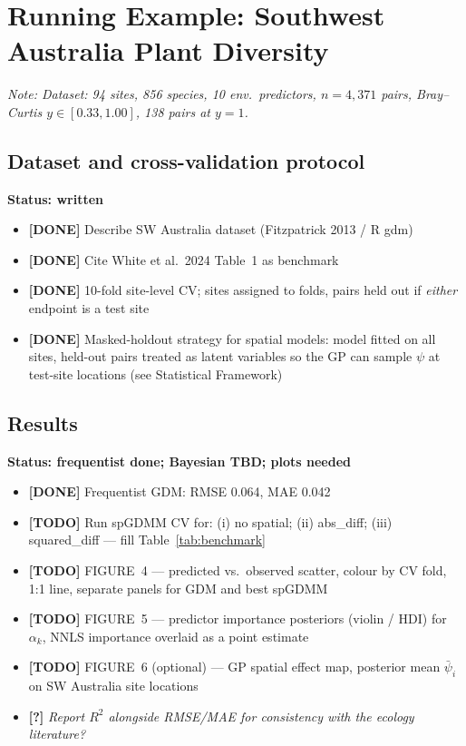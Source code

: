 \documentclass[11pt,a4paper]{article}
\newcommand{\done}[1]{{\color{donegreen}\textbf{[DONE]} #1}}
\newcommand{\todo}[1]{{\color{todored}\textbf{[TODO]} #1}}
\newcommand{\question}[1]{{\color{questionblue}\textbf{[?]} \textit{#1}}}
\newcommand{\note}[1]{{\color{notegray}\textit{Note: #1}}}
\newenvironment{scaffold}[1]{%
  \begin{mdframed}[backgroundcolor=gray!6, linecolor=gray!30,
                   leftmargin=0pt, rightmargin=0pt,
                   innerleftmargin=8pt, innerrightmargin=8pt,
                   innertopmargin=6pt, innerbottommargin=6pt]
  \noindent\textbf{#1}\par\vspace{2pt}
  \begin{itemize}[leftmargin=1.4em, topsep=2pt, itemsep=1pt, parsep=0pt]
}{%
  \end{itemize}
  \end{mdframed}
  \vspace{4pt}
}
\begin{document}
\section{Running Example: Southwest Australia Plant Diversity}

\note{Dataset: 94 sites, 856 species, 10 env.\ predictors,
$n = 4{,}371$ pairs, Bray--Curtis $y \in [0.33, 1.00]$, 138 pairs at $y=1$.}

\subsection{Dataset and cross-validation protocol}

\begin{scaffold}{Status: written}
  \item \done{Describe SW Australia dataset (Fitzpatrick 2013 / R gdm)}
  \item \done{Cite White et al.\ 2024 Table~1 as benchmark}
  \item \done{10-fold site-level CV; sites assigned to folds,
    pairs held out if \emph{either} endpoint is a test site}
  \item \done{Masked-holdout strategy for spatial models: model fitted on
    all sites, held-out pairs treated as latent variables so the GP can
    sample $\psi$ at test-site locations (see Statistical Framework)}
\end{scaffold}

\subsection{Results}

\begin{scaffold}{Status: frequentist done; Bayesian TBD; plots needed}
  \item \done{Frequentist GDM: RMSE 0.064, MAE 0.042}
  \item \todo{Run spGDMM CV for: (i) no spatial; (ii) abs\_diff;
    (iii) squared\_diff --- fill Table~\ref{tab:benchmark}}
  \item \todo{FIGURE~4 --- predicted vs.\ observed scatter, colour by CV fold,
    1:1 line, separate panels for GDM and best spGDMM}
  \item \todo{FIGURE~5 --- predictor importance posteriors (violin / HDI)
    for $\alpha_k$, NNLS importance overlaid as a point estimate}
  \item \todo{FIGURE~6 (optional) --- GP spatial effect map, posterior mean
    $\bar\psi_i$ on SW Australia site locations}
  \item \question{Report $R^2$ alongside RMSE/MAE for consistency with the
    ecology literature?}
\end{scaffold}
\end{document}
